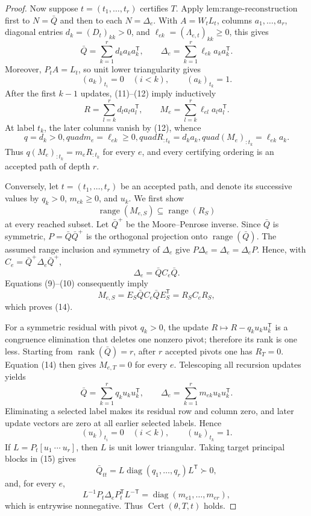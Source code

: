 \documentclass{article}
\begin{document}
\begin{proof}
Now suppose \(t=(t_1,\ldots,t_r)\) certifies \(T\).  Apply \(\text{lem:range-reconstruction}\) first to \(N=\bar Q\) and then to each \(N=\Delta_e\).  With \(A=W_tL_t\), columns \(a_1,\ldots,a_r\), diagonal entries \(d_k=(D_t)_{kk}>0\), and \(\ell_{ek}=(\Lambda_{e,t})_{kk}\ge0\), this gives
\[
 \bar Q=\sum_{k=1}^r d_ka_ka_k^{\mathsf T},
 \qquad
 \Delta_e=\sum_{k=1}^r\ell_{ek}a_ka_k^{\mathsf T}. \tag{11}
\]
Moreover, \(P_tA=L_t\), so unit lower triangularity gives
\[
 (a_k)_{t_i}=0\quad(i<k),\qquad (a_k)_{t_k}=1. \tag{12}
\]
After the first \(k-1\) updates, (11)--(12) imply inductively
\[
 R=\sum_{l=k}^r d_la_la_l^{\mathsf T},
 \qquad M_e=\sum_{l=k}^r\ell_{el}a_la_l^{\mathsf T}. \tag{13}
\]
At label \(t_k\), the later columns vanish by (12), whence
\[
 q=d_k>0,quad m_e=\ell_{ek}\ge0,quad
 R_{:t_k}=d_ka_k,quad (M_e)_{:t_k}=\ell_{ek}a_k.
\]
Thus \(q(M_e)_{:t_k}=m_eR_{:t_k}\) for every \(e\), and every certifying ordering is an accepted path of depth \(r\).

Conversely, let \(t=(t_1,\ldots,t_r)\) be an accepted path, and denote its successive values by \(q_k>0\), \(m_{ek}\ge0\), and \(u_k\).  We first show
\[
 \operatorname{range}(M_{e,S})\subseteq\operatorname{range}(R_S) \tag{14}
\]
at every reached subset.  Let \(\bar Q^+\) be the Moore--Penrose inverse.  Since \(\bar Q\) is symmetric, \(P=\bar Q\bar Q^+\) is the orthogonal projection onto \(\operatorname{range}(\bar Q)\).  The assumed range inclusion and symmetry of \(\Delta_e\) give \(P\Delta_e=\Delta_e=\Delta_eP\).  Hence, with \(C_e=\bar Q^+\Delta_e\bar Q^+\),
\[
 \Delta_e=\bar QC_e\bar Q.
\]
Equations (9)--(10) consequently imply
\[
 M_{e,S}=E_S\bar QC_e\bar QE_S^{\mathsf T}=R_SC_eR_S,
\]
which proves (14).

For a symmetric residual with pivot \(q_k>0\), the update \(R\mapsto R-q_ku_ku_k^{\mathsf T}\) is a congruence elimination that deletes one nonzero pivot; therefore its rank is one less.  Starting from \(\operatorname{rank}(\bar Q)=r\), after \(r\) accepted pivots one has \(R_T=0\).  Equation (14) then gives \(M_{e,T}=0\) for every \(e\).  Telescoping all recursion updates yields
\[
 \bar Q=\sum_{k=1}^r q_ku_ku_k^{\mathsf T},
 \qquad
 \Delta_e=\sum_{k=1}^r m_{ek}u_ku_k^{\mathsf T}. \tag{15}
\]
Eliminating a selected label makes its residual row and column zero, and later update vectors are zero at all earlier selected labels.  Hence
\[
 (u_k)_{t_i}=0\quad(i<k),\qquad (u_k)_{t_k}=1.
\]
If \(L=P_t[u_1\ \cdots\ u_r]\), then \(L\) is unit lower triangular.  Taking target principal blocks in (15) gives
\[
 \bar Q_{tt}=L\operatorname{diag}(q_1,\ldots,q_r)L^{\mathsf T}\succ0,
\]
and, for every \(e\),
\[
 L^{-1}P_t\Delta_eP_t^{\mathsf T}L^{-\mathsf T}
 =\operatorname{diag}(m_{e1},\ldots,m_{er}), \tag{16}
\]
which is entrywise nonnegative.  Thus \(\operatorname{Cert}(\theta,T,t)\) holds.


\end{proof}
\end{document}
